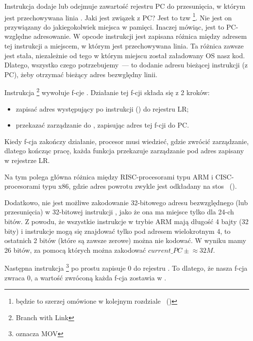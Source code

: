 \myindex{\PICcode}
Instrukcja  dodaje lub odejmuje zawartość rejestru \ac{PC} do przesunięcia, w którym jest przechowywana linia
.
Jaki jest związek z \ac{PC}? Jest to tzw \q{\PICcode}
\footnote{będzie to szerzej omówione w kolejnym rozdziale ~()}.
Nie jest on przywiązany do jakiegokolwiek miejsca w pamięci.
Inaczej mówiąc, jest to \ac{PC}-względne adresowanie.
W opcode instrukcji  jest zapisana różnica między adresem tej instrukcji a miejscem, w którym jest przechowywana linia.
Ta różnica zawsze jest stała, niezależnie od tego w którym miejscu został załadowany \ac{OS} nasz kod.
Dlatego, wszystko czego potrzebujemy~--- to dodanie adresu bieżącej instrukcji (z \ac{PC}), żeby otrzymać bieżący adres bezwględny linii.

Instrukcja \footnote{Branch with Link} wywołuje f-cje \printf.
Działanie tej f-cji składa się z 2 kroków:

\begin{itemize}
\item zapisać adres występujący po instrukcji  () do rejestru \ac{LR};
\item przekazać zarządzanie do \printf, zapisując adres tej f-cji do \ac{PC}.
\end{itemize}

Kiedy f-cja \printf zakończy działanie, procesor musi wiedzieć, gdzie zwrócić zarządzanie, dlatego kończąc pracę, każda funkcja przekazuje zarządzanie pod adres zapisany w rejestrze \ac{LR}.

Na tym polega główna różnica między \ac{RISC}-procesorami typu ARM i \ac{CISC}-procesorami typu x86,
gdzie adres powrotu zwykle jest odkładany na stos ~().

Dodatkowo, nie jest możliwe zakodowanie 32-bitowego adresu bezwzględnego (lub przesunięcia) w 32-bitowej instrukcji , jako że ona ma miejsce tylko dla 24-ch bitów.
Z powodu, że wszystkie instrukcje w trybie ARM mają długość 4 bajty (32 bity) i instrukcje mogą się znajdować tylko pod adresem wielokrotnym 4, to ostatnich 2 bitów (które są zawsze zerowe) można nie kodować.
W wyniku mamy 26 bitów, za pomocą których można zakodować $current\_PC \pm{} \approx{}32M$.

Następna instrukcja \footnote{oznacza MOV}
po prostu zapisuje 0 do rejestru .
To dlatego, że nasza f-cja zwraca 0, a wartość zwróconą każda f-cja zostawia w .

